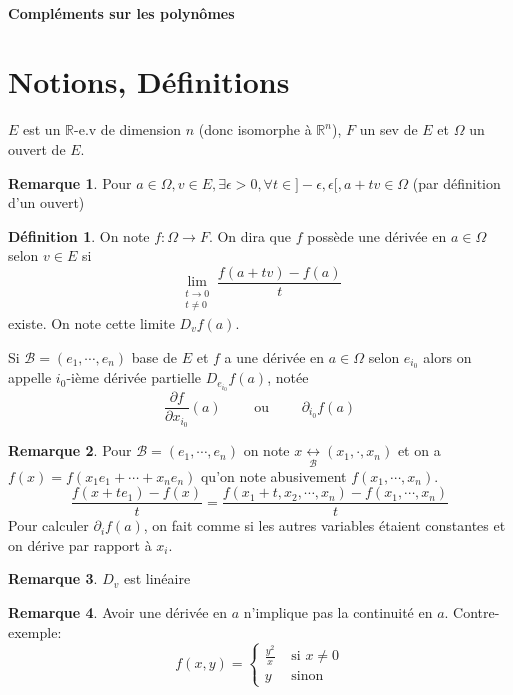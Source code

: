 \documentclass{article}
\theoremstyle{definition}
\newtheorem*{dfn}{Définition}
\newtheorem*{rem}{Remarque}
\begin{document}
~

\vspace{1cm}

\begin{center}
\textbf{\LARGE Compléments sur les polynômes} \\[1em]
\end{center}
\tableofcontents
\thispagestyle{empty}

\newpage
\setcounter{page}{1}
\section{Notions, Définitions}

$E$ est un $\mathbb R$-e.v de dimension $n$ (donc isomorphe à $\mathbb R^n$), $F$ un sev de $E$ et $\Omega$ un ouvert de $E$.

\begin{rem}
Pour $a\in\Omega, v\in E, \exists \epsilon>0, \forall t\in ]-\epsilon, \epsilon[, a+tv\in\Omega$ (par définition d'un ouvert)
\end{rem}

\begin{dfn}
On note $f:\Omega \longrightarrow F$. On dira que $f$ possède une dérivée en $a\in\Omega$ selon $v\in E$ si \[
    \lim_{\substack{t\to 0\\ t\neq 0}}\frac{f(a+tv)-f(a)}t
\] existe. On note cette limite $D_vf(a)$.

Si $\mathcal B=(e_1,\cdots, e_n)$ base de $E$ et $f$ a une dérivée en $a\in\Omega$ selon $e_{i_0}$ alors on appelle $i_0$-ième dérivée partielle $D_{e_{i_0}}f(a)$, notée \[
    \frac{\partial f}{\partial x_{i_0}}(a)\qquad \text{ ou }\qquad \partial_{i_0}f(a)
\]
\end{dfn}

\begin{rem}
Pour $\mathcal B=(e_1, \cdots, e_n)$ on note $x\underset{\mathcal B}{\longleftrightarrow}(x_1, \cdot, x_n)$ et on a $f(x)=f(x_1e_1+\cdots + x_ne_n)$ qu'on note abusivement $f(x_1, \cdots, x_n)$. \[
    \frac{f(x+te_1)-f(x)}{t}=\frac{f(x_1+t, x_2, \cdots, x_n)-f(x_1, \cdots, x_n)}{t}
\]
Pour calculer $\partial_if(a)$, on fait comme si les autres variables étaient constantes et on dérive par rapport à $x_i$.
\end{rem}

\begin{rem}
$D_v$ est linéaire
\end{rem}

\begin{rem}
Avoir une dérivée en $a$ n'implique pas la continuité en $a$. Contre-exemple: \[
    f(x, y)=\begin{cases}
    \frac{y^2}x &\text{ si }x\neq 0\\ y & \text{ sinon}
    \end{cases}
\]
\end{rem}
\end{document}
